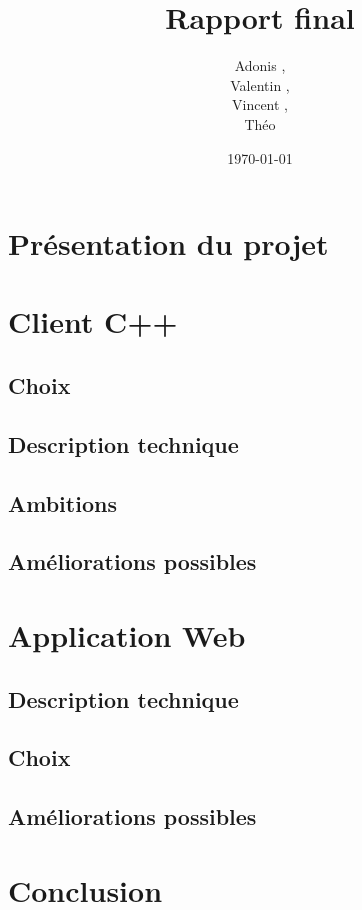 \documentclass[a4paper]{article}
\title{Rapport final}
\author{Adonis \bsc{Najimi},\\
 Valentin \bsc{Stern},\\
 Vincent \bsc{Albert},\\
 Théo \bsc{Gerriet}}
\date{\today}
\begin{document}
\maketitle
\newpage

\section{Présentation du projet}


\section{Client C++}
		\subsection{Choix}
    
		
    \subsection{Description technique}
    

    \subsection{Ambitions}
    
    
    \subsection{Améliorations possibles}
    

\newpage
\section{Application Web}
	\subsection{Description technique}
	
	\subsection{Choix}
	
	\subsection{Améliorations possibles}
	
	
\newpage
\section{Conclusion}

\newpage
\tableofcontents
\end{document}
